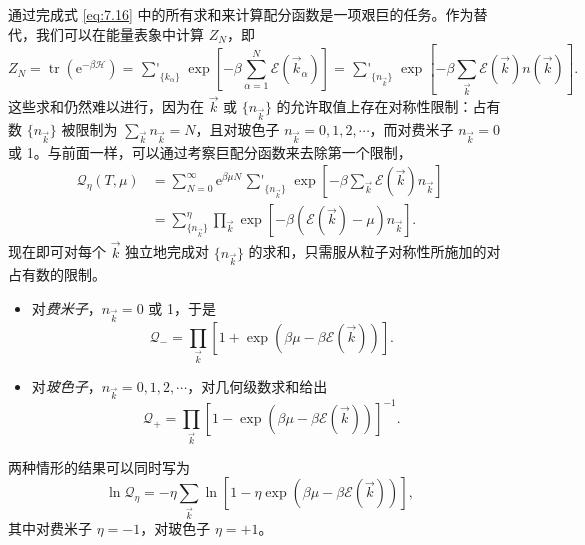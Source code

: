 


通过完成式 \eqref{eq:7.16} 中的所有求和来计算配分函数是一项艰巨的任务。作为替代，我们可以在能量表象中计算 $Z_N$，即
\begin{equation}\label{eq:7.23}
Z_N=\operatorname{tr}\left(\mathrm e^{-\beta\mathscr H}\right)=\mathop{{\sum}'}_{\{k_\alpha\}}\exp\left[-\beta\sum_{\alpha=1}^N\mathcal E(\vec k_\alpha)\right]=\mathop{{\sum}'}_{\{n_{\vec k}\}}\exp\left[-\beta\sum_{\vec k}\mathcal E(\vec k)n(\vec k)\right].
\end{equation}
这些求和仍然难以进行，因为在 $\vec k$ 或 $\{n_{\vec k}\}$ 的允许取值上存在对称性限制：占有数 $\{n_{\vec k}\}$ 被限制为 $\sum_{\vec k}n_{\vec k}=N$，且对玻色子 $n_{\vec k}=0,1,2,\cdots$，而对费米子 $n_{\vec k}=0$ 或 1。与前面一样，可以通过考察巨配分函数来去除第一个限制，
\begin{equation}\label{eq:7.24}
\begin{aligned}
\mathcal Q_\eta(T,\mu)&=\sum_{N=0}^\infty\mathrm e^{\beta\mu N}\mathop{{\sum}'}_{\{n_{\vec k}\}}\exp\left[-\beta\sum_{\vec k}\mathcal E(\vec k)n_{\vec k}\right]\\
&=\sum_{\{n_{\vec k}\}}^\eta\prod_{\vec k}\exp\left[-\beta\left(\mathcal E(\vec k)-\mu\right)n_{\vec k}\right].
\end{aligned}
\end{equation}
现在即可对每个 $\vec k$ 独立地完成对 $\{n_{\vec k}\}$ 的求和，只需服从粒子对称性所施加的对占有数的限制。

\begin{itemize}
\item 对\emph{费米子}，$n_{\vec k}=0$ 或 1，于是
\begin{equation}\label{eq:7.25}
\mathcal Q_-=\prod_{\vec k}\left[1+\exp\left(\beta\mu-\beta\mathcal E(\vec k)\right)\right].
\end{equation}
\item 对\emph{玻色子}，$n_{\vec k}=0,1,2,\cdots$，对几何级数求和给出
\begin{equation}\label{eq:7.26}
\mathcal Q_+=\prod_{\vec k}\left[1-\exp\left(\beta\mu-\beta\mathcal E(\vec k)\right)\right]^{-1}.
\end{equation}
\end{itemize}

两种情形的结果可以同时写为
\begin{equation}\label{eq:7.27}
\ln\mathcal Q_\eta=-\eta\sum_{\vec k}\ln\left[1-\eta\exp\left(\beta\mu-\beta\mathcal E(\vec k)\right)\right],
\end{equation}
其中对费米子 $\eta=-1$，对玻色子 $\eta=+1$。

